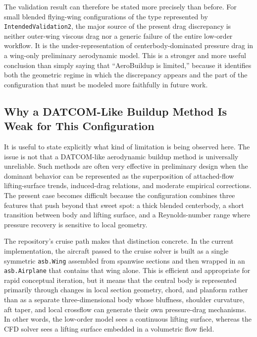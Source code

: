 \documentclass[12pt]{report}
\begin{document}
The validation result can therefore be stated more precisely than before. For small blended flying-wing configurations of the type represented by \texttt{IntendedValidation2}, the major source of the present drag discrepancy is neither outer-wing viscous drag nor a generic failure of the entire low-order workflow. It is the under-representation of centerbody-dominated pressure drag in a wing-only preliminary aerodynamic model. This is a stronger and more useful conclusion than simply saying that ``AeroBuildup is limited,'' because it identifies both the geometric regime in which the discrepancy appears and the part of the configuration that must be modeled more faithfully in future work.

\subsection{Why a DATCOM-Like Buildup Method Is Weak for This Configuration}
It is useful to state explicitly what kind of limitation is being observed here. The issue is not that a DATCOM-like aerodynamic buildup method is universally unreliable. Such methods are often very effective in preliminary design when the dominant behavior can be represented as the superposition of attached-flow lifting-surface trends, induced-drag relations, and moderate empirical corrections. The present case becomes difficult because the configuration combines three features that push beyond that sweet spot: a thick blended centerbody, a short transition between body and lifting surface, and a Reynolds-number range where pressure recovery is sensitive to local geometry.

The repository's cruise path makes that distinction concrete. In the current implementation, the aircraft passed to the cruise solver is built as a single symmetric \texttt{asb.Wing} assembled from spanwise sections and then wrapped in an \texttt{asb.Airplane} that contains that wing alone. This is efficient and appropriate for rapid conceptual iteration, but it means that the central body is represented primarily through changes in local section geometry, chord, and planform rather than as a separate three-dimensional body whose bluffness, shoulder curvature, aft taper, and local crossflow can generate their own pressure-drag mechanisms. In other words, the low-order model sees a continuous lifting surface, whereas the CFD solver sees a lifting surface embedded in a volumetric flow field.
\end{document}
